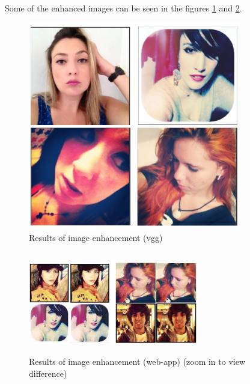 \documentclass[conference]{IEEEtran}
\begin{document}
		\par Some of the enhanced images can be seen in the figures \ref{res-fig} and \ref{res2-fig}.
		\begin{figure}[htbp]
			\centerline{\includegraphics[width=25em]{res_vgg.png}}
			\caption{Results of image enhancement (vgg)}
			\label{res-fig}
		\end{figure}
		\begin{figure}[htbp]
			\centerline{\includegraphics[height=12em, width=20em]{res_2.png}}
			\caption{Results of image enhancement (web-app) (zoom in to view difference)}
			\label{res2-fig}
		\end{figure}
	
\end{document}
